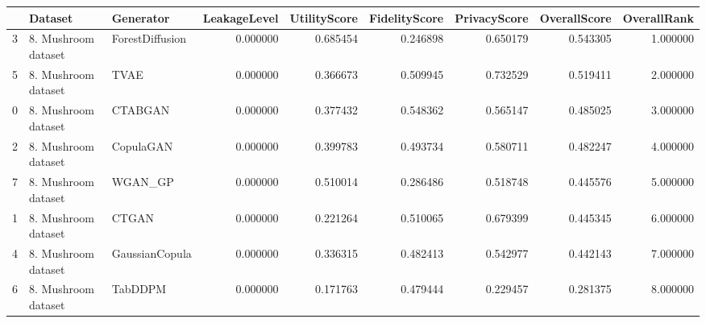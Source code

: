 \begin{tabular}{lllrrrrrr}
\toprule
 & Dataset & Generator & LeakageLevel & UtilityScore & FidelityScore & PrivacyScore & OverallScore & OverallRank \\
\midrule
3 & 8. Mushroom dataset & ForestDiffusion & 0.000000 & 0.685454 & 0.246898 & 0.650179 & 0.543305 & 1.000000 \\
5 & 8. Mushroom dataset & TVAE & 0.000000 & 0.366673 & 0.509945 & 0.732529 & 0.519411 & 2.000000 \\
0 & 8. Mushroom dataset & CTABGAN & 0.000000 & 0.377432 & 0.548362 & 0.565147 & 0.485025 & 3.000000 \\
2 & 8. Mushroom dataset & CopulaGAN & 0.000000 & 0.399783 & 0.493734 & 0.580711 & 0.482247 & 4.000000 \\
7 & 8. Mushroom dataset & WGAN_GP & 0.000000 & 0.510014 & 0.286486 & 0.518748 & 0.445576 & 5.000000 \\
1 & 8. Mushroom dataset & CTGAN & 0.000000 & 0.221264 & 0.510065 & 0.679399 & 0.445345 & 6.000000 \\
4 & 8. Mushroom dataset & GaussianCopula & 0.000000 & 0.336315 & 0.482413 & 0.542977 & 0.442143 & 7.000000 \\
6 & 8. Mushroom dataset & TabDDPM & 0.000000 & 0.171763 & 0.479444 & 0.229457 & 0.281375 & 8.000000 \\
\bottomrule
\end{tabular}
